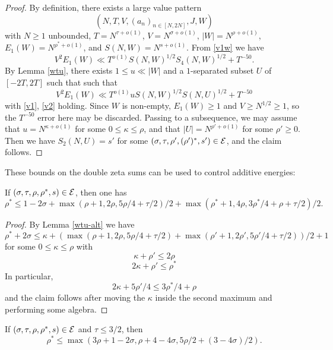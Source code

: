 \begin{proof}  By definition, there exists a large value pattern $$(N,T,V,(a_n)_{n \in [N,2N]},J,W)$$ with $N \geq 1$ unbounded, $T = N^{\tau+o(1)}$, $V = N^{\sigma+o(1)}$, $|W| = N^{\rho+o(1)}$, $E_1(W) = N^{\rho^*+o(1)}$, and $S(N,W) = N^{s+o(1)}$. From \eqref{v1w} we have
$$
    V^2 E_1(W) \ll T^{o(1)} S(N,W)^{1/2} S_4(N,W)^{1/2} + T^{-50}.
$$
By Lemma \ref{wtu}, there exists $1 \leq u \ll |W|$ and a $1$-separated subset $U$ of $[-2T,2T]$ such that
 such that
$$
    V^2 E_1(W) \ll T^{o(1)} u S(N,W)^{1/2} S(N,U)^{1/2} + T^{-50}
$$
with \eqref{v1}, \eqref{v2} holding.  Since $W$ is non-empty, $E_1(W) \geq 1$ and $V \geq N^{1/2} \geq 1$, so the $T^{-50}$ error here may be discarded.  Passing to a subsequence, we may assume that $u = N^{\kappa+o(1)}$ for some $0 \leq \kappa \leq \rho$, and that $|U| = N^{\rho'+o(1)}$ for some $\rho' \geq 0$.  Then we have $S_2(N,U) = s'$ for some
$(\sigma,\tau,\rho',(\rho')^*,s') \in \mathcal{E}$, and the claim follows.
\end{proof}

These bounds on the double zeta sums can be used to control additive energies:

\begin{theorem}\label{hbt}\cite[(33)]{heathbrown_zero_1979} If $(\sigma,\tau,\rho,\rho^*,s) \in \mathcal{E}$, then one has
$$ \rho^* \leq 1-2\sigma + \max(\rho+1, 2\rho, 5\rho/4+\tau/2)/2 + \max(\rho^*+1, 4\rho, 3\rho^*/4+\rho+\tau/2)/2.$$
\end{theorem}

\begin{proof} By Lemma \ref{wtu-alt} we have
$$ \rho^* + 2\sigma \leq \kappa + ( \max( \rho+1, 2\rho, 5\rho/4+\tau/2)+ \max( \rho'+1, 2\rho', 5\rho'/4+\tau/2) )/2 + 1$$
for some $0 \leq \kappa \leq \rho$ with
$$ \kappa + \rho' \leq 2\rho$$
$$ 2\kappa + \rho' \leq \rho^*$$
In particular,
$$ 2\kappa + 5\rho'/4 \leq 3\rho^*/4 + \rho$$
and the claim follows after moving the $\kappa$ inside the second maximum and performing some algebra.
\end{proof}

\begin{corollary}\label{hb-energy-simp}  If $(\sigma,\tau,\rho,\rho^*,s) \in \mathcal{E}$ and $\tau \leq 3/2$, then
$$ \rho^* \leq \max(3 \rho + 1-2\sigma, \rho +4-4\sigma, 5\rho/2 + (3-4\sigma)/2).$$
\end{corollary}


